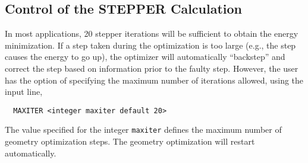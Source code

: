\subsection{Control of the STEPPER Calculation}


In most applications, 20 stepper iterations will be sufficient to obtain
the energy minimization.  If a step taken during the
optimization is too large (e.g., the step causes the energy to go up), 
the optimizer will automatically ``backstep'' and correct the step 
based on information prior to the faulty step.  However, the user has 
the option of specifying 
the maximum number of iterations allowed, using the input line,

\begin{verbatim}
  MAXITER <integer maxiter default 20>
\end{verbatim}

The value specified for the integer \verb+maxiter+ defines the maximum 
number of geometry optimization steps.  The
geometry optimization will restart automatically.







